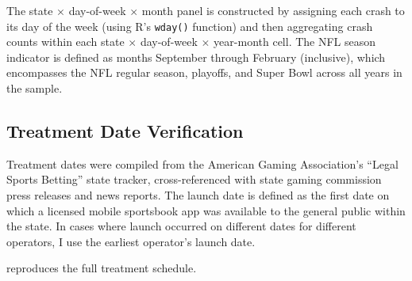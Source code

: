 \documentclass[12pt]{article}
\begin{document}
The state $\times$ day-of-week $\times$ month panel is constructed by assigning each crash to its day of the week (using R's \texttt{wday()} function) and then aggregating crash counts within each state $\times$ day-of-week $\times$ year-month cell. The NFL season indicator is defined as months September through February (inclusive), which encompasses the NFL regular season, playoffs, and Super Bowl across all years in the sample.

\subsection{Treatment Date Verification}

Treatment dates were compiled from the American Gaming Association's ``Legal Sports Betting'' state tracker, cross-referenced with state gaming commission press releases and news reports. The launch date is defined as the first date on which a licensed mobile sportsbook app was available to the general public within the state. In cases where launch occurred on different dates for different operators, I use the earliest operator's launch date.

 reproduces the full treatment schedule.
\end{document}
